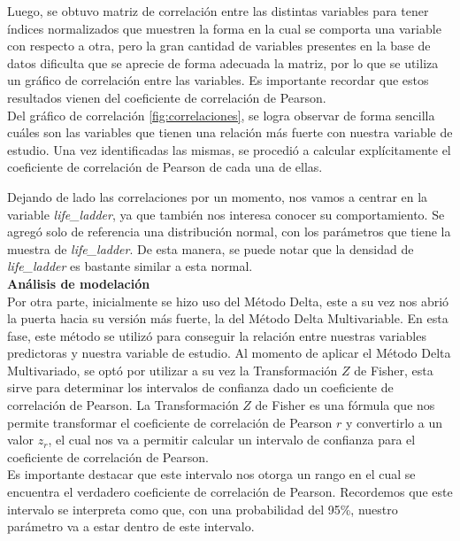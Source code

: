 Luego, se obtuvo matriz de correlación entre las distintas variables para tener índices normalizados que muestren la forma en la cual se comporta una variable con respecto a otra, pero la gran cantidad de variables presentes en la base de datos dificulta que se aprecie de forma adecuada la matriz, por lo que se utiliza un gráfico de correlación entre las variables. Es importante recordar que estos resultados vienen del coeficiente de correlación de Pearson.\\

Del gráfico de correlación \ref{fig:correlaciones}, se logra observar de forma sencilla cuáles son las variables que tienen una relación más fuerte con nuestra variable de estudio. Una vez identificadas las mismas, se procedió a calcular explícitamente el coeficiente de correlación de Pearson de cada una de ellas. 

Dejando de lado las correlaciones por un momento, nos vamos a centrar en la variable \textit{life\_ladder}, ya que también nos interesa conocer su comportamiento. Se agregó solo de referencia una distribución normal, con los parámetros que tiene la muestra de \textit{life\_ladder}. De esta manera, se puede notar que la densidad de \textit{life\_ladder} es bastante similar a esta normal. \\

\textbf{Análisis de modelación} \\

Por otra parte, inicialmente se hizo uso del Método Delta, este a su vez nos abrió la puerta hacia su versión más fuerte, la del Método Delta Multivariable. En esta fase, este método se utilizó para conseguir la relación entre nuestras variables predictoras y nuestra variable de estudio. Al momento de aplicar el Método Delta Multivariado, se optó por utilizar a su vez la Transformación $Z$ de Fisher, esta sirve para determinar los intervalos de confianza dado un coeficiente de correlación de Pearson. La Transformación $Z$ de Fisher es una fórmula que nos permite transformar el coeficiente de correlación de Pearson $r$ y convertirlo a un valor $z_r$, el cual nos va a permitir calcular un intervalo de confianza para el coeficiente de correlación de Pearson. \\

Es importante destacar que este intervalo nos otorga un rango en el cual se encuentra el verdadero coeficiente de correlación de Pearson. Recordemos que este intervalo se interpreta como que, con una probabilidad del 95\%, nuestro parámetro va a estar dentro de este intervalo.\\


